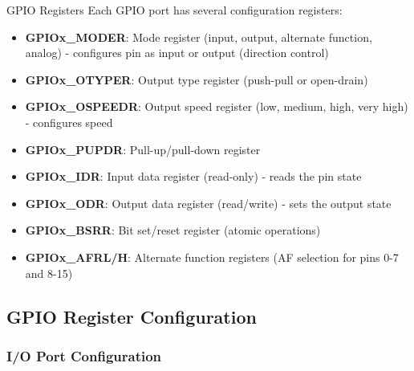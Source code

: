 \begin{definition}{GPIO Registers}
Each GPIO port has several configuration registers:
\begin{itemize}
    \item \textbf{GPIOx\_MODER}: Mode register (input, output, alternate function, analog) - configures pin as input or output (direction control)
    \item \textbf{GPIOx\_OTYPER}: Output type register (push-pull or open-drain)
    \item \textbf{GPIOx\_OSPEEDR}: Output speed register (low, medium, high, very high) - configures speed
    \item \textbf{GPIOx\_PUPDR}: Pull-up/pull-down register
    \item \textbf{GPIOx\_IDR}: Input data register (read-only) - reads the pin state
    \item \textbf{GPIOx\_ODR}: Output data register (read/write) - sets the output state
    \item \textbf{GPIOx\_BSRR}: Bit set/reset register (atomic operations)
    \item \textbf{GPIOx\_AFRL/H}: Alternate function registers (AF selection for pins 0-7 and 8-15)
\end{itemize}
\end{definition}



\raggedcolumns
\columnbreak

\subsection{GPIO Register Configuration}


\subsubsection{I/O Port Configuration}

